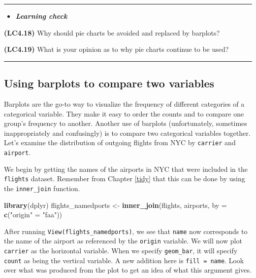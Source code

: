 \documentclass[]{tufte-book}
\newenvironment{Shaded}{\begin{snugshade}}{\end{snugshade}}
\newcommand{\KeywordTok}[1]{\textcolor[rgb]{0.13,0.29,0.53}{\textbf{{#1}}}}
\newcommand{\DataTypeTok}[1]{\textcolor[rgb]{0.13,0.29,0.53}{{#1}}}
\newcommand{\StringTok}[1]{\textcolor[rgb]{0.31,0.60,0.02}{{#1}}}
\newcommand{\NormalTok}[1]{{#1}}
\let\oldrule=\rule
\renewcommand{\rule}[1]{\oldrule{\linewidth}}
\newenvironment{rmdblock}[1]
  {\begin{shaded*}
  \begin{itemize}
  \renewcommand{\labelitemi}{
    \raisebox{-.7\height}[0pt][0pt]{
    }
  }
  \item
  }
  {
  \end{itemize}
  \end{shaded*}
  }
\newenvironment{learncheck}
  {\begin{rmdblock}{warning}}
  {\end{rmdblock}}
\begin{document}
\begin{center}\rule{0.5\linewidth}{\linethickness}\end{center}

\begin{learncheck}
\textbf{\emph{Learning check}}
\end{learncheck}

\textbf{(LC4.18)} Why should pie charts be avoided and replaced by
barplots?

\textbf{(LC4.19)} What is your opinion as to why pie charts continue to
be used?

\begin{center}\rule{0.5\linewidth}{\linethickness}\end{center}

\subsection{Using barplots to compare two
variables}\label{using-barplots-to-compare-two-variables}

Barplots are the go-to way to visualize the frequency of different
categories of a categorical variable. They make it easy to order the
counts and to compare one group's frequency to another. Another use of
barplots (unfortunately, sometimes inappropriately and confusingly) is
to compare two categorical variables together. Let's examine the
distribution of outgoing flights from NYC by \texttt{carrier} and
\texttt{airport}.

We begin by getting the names of the airports in NYC that were included
in the \texttt{flights} dataset. Remember from Chapter \ref{tidy} that
this can be done by using the \texttt{inner\_join} function.

\begin{Shaded}
\begin{Highlighting}[]
\KeywordTok{library}\NormalTok{(dplyr)}
\NormalTok{flights_namedports <-}\StringTok{ }\KeywordTok{inner_join}\NormalTok{(flights, airports, }\DataTypeTok{by =} \KeywordTok{c}\NormalTok{(}\StringTok{"origin"} \NormalTok{=}\StringTok{ "faa"}\NormalTok{))}
\end{Highlighting}
\end{Shaded}

After running \texttt{View(flights\_namedports)}, we see that
\texttt{name} now corresponds to the name of the airport as referenced
by the \texttt{origin} variable. We will now plot \texttt{carrier} as
the horizontal variable. When we specify \texttt{geom\_bar}, it will
specify \texttt{count} as being the vertical variable. A new addition
here is \texttt{fill\ =\ name}. Look over what was produced from the
plot to get an idea of what this argument gives.
\end{document}
